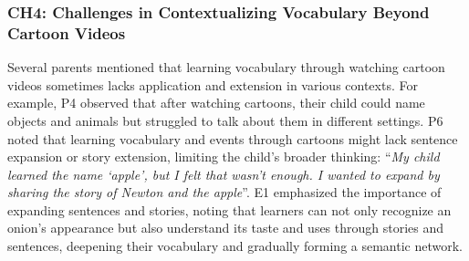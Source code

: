 \subsubsection{CH4: Challenges in Contextualizing Vocabulary Beyond Cartoon Videos}
Several parents mentioned that learning vocabulary through watching cartoon videos sometimes lacks application and extension in various contexts.
For example, P4 observed that after watching cartoons, their child could name objects and animals but struggled to talk about them in different settings. P6 noted that learning vocabulary and events through cartoons might lack sentence expansion or story extension, limiting the child's broader thinking: ``\textit{My child learned the name `apple', but I felt that wasn't enough. I wanted to expand by sharing the story of Newton and the apple}''.
E1 emphasized the importance of expanding sentences and stories, noting that learners can not only recognize an onion's appearance but also understand its taste and uses through stories and sentences, deepening their vocabulary and gradually forming a semantic network.









